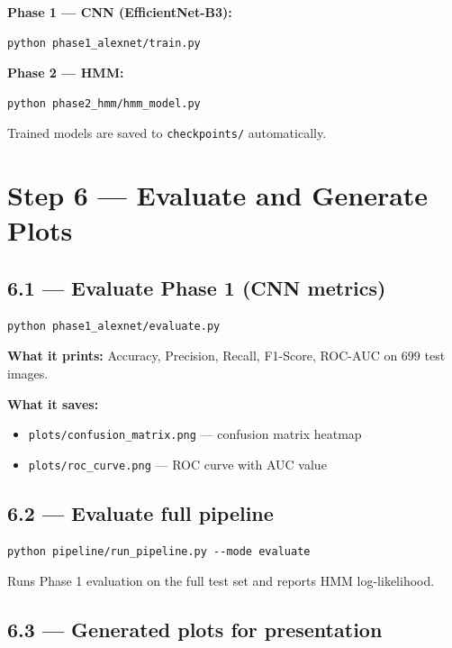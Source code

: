 \documentclass[11pt]{article}
\begin{document}
\textbf{Phase 1 --- CNN (EfficientNet-B3):}
\begin{verbatim}
python phase1_alexnet/train.py
\end{verbatim}

\textbf{Phase 2 --- HMM:}
\begin{verbatim}
python phase2_hmm/hmm_model.py
\end{verbatim}

Trained models are saved to \texttt{checkpoints/} automatically.

\section{Step 6 --- Evaluate and Generate Plots}

\subsection{6.1 --- Evaluate Phase 1 (CNN metrics)}

\begin{verbatim}
python phase1_alexnet/evaluate.py
\end{verbatim}

\textbf{What it prints:} Accuracy, Precision, Recall, F1-Score, ROC-AUC on 699 test images.

\textbf{What it saves:}
\begin{itemize}[noitemsep]
    \item \texttt{plots/confusion\_matrix.png} --- confusion matrix heatmap
    \item \texttt{plots/roc\_curve.png} --- ROC curve with AUC value
\end{itemize}

\subsection{6.2 --- Evaluate full pipeline}

\begin{verbatim}
python pipeline/run_pipeline.py --mode evaluate
\end{verbatim}

Runs Phase 1 evaluation on the full test set and reports HMM log-likelihood.

\subsection{6.3 --- Generated plots for presentation}
\end{document}
